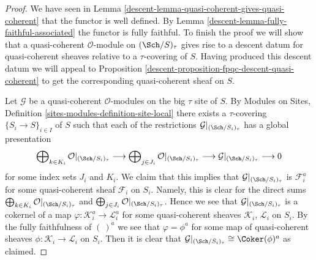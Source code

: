 \begin{proof}

We have seen in Lemma \ref{descent-lemma-quasi-coherent-gives-quasi-coherent}
that the functor is well defined. By Lemma \ref{descent-lemma-fully-faithful-associated}
the functor is fully faithful. To finish the proof we will show that a
quasi-coherent $\mathcal{O}$-module on $(\Sch/S)_\tau$ gives
rise to a descent datum for quasi-coherent sheaves relative to a
$\tau$-covering of $S$. Having produced this descent datum we will appeal
to Proposition \ref{descent-proposition-fpqc-descent-quasi-coherent} to get the
corresponding quasi-coherent sheaf on $S$.

\medskip\noindent
Let $\mathcal{G}$ be a quasi-coherent $\mathcal{O}$-modules on
the big $\tau$ site of $S$. By
Modules on Sites, Definition \ref{sites-modules-definition-site-local}
there exists a $\tau$-covering $\{S_i \to S\}_{i \in I}$ of $S$
such that each of the restrictions
$\mathcal{G}|_{(\Sch/S_i)_\tau}$ has a global presentation
$$
\bigoplus\nolimits_{k \in K_i} \mathcal{O}|_{(\Sch/S_i)_\tau}
\longrightarrow
\bigoplus\nolimits_{j \in J_i} \mathcal{O}|_{(\Sch/S_i)_\tau}
\longrightarrow
\mathcal{G}|_{(\Sch/S_i)_\tau} \longrightarrow 0
$$
for some index sets $J_i$ and $K_i$. We claim that this implies
that $\mathcal{G}|_{(\Sch/S_i)_\tau}$ is $\mathcal{F}_i^a$
for some quasi-coherent sheaf $\mathcal{F}_i$ on $S_i$. Namely,
this is clear for the direct sums
$\bigoplus\nolimits_{k \in K_i} \mathcal{O}|_{(\Sch/S_i)_\tau}$
and
$\bigoplus\nolimits_{j \in J_i} \mathcal{O}|_{(\Sch/S_i)_\tau}$.
Hence we see that $\mathcal{G}|_{(\Sch/S_i)_\tau}$ is a
cokernel of a map $\varphi : \mathcal{K}_i^a \to \mathcal{L}_i^a$
for some quasi-coherent sheaves $\mathcal{K}_i$, $\mathcal{L}_i$
on $S_i$. By the fully faithfulness of $(\ )^a$ we see that
$\varphi = \phi^a$ for some map of quasi-coherent sheaves
$\phi : \mathcal{K}_i \to \mathcal{L}_i$ on $S_i$. Then it is
clear that
$\mathcal{G}|_{(\Sch/S_i)_\tau} \cong \Coker(\phi)^a$
as claimed.


\end{proof}
